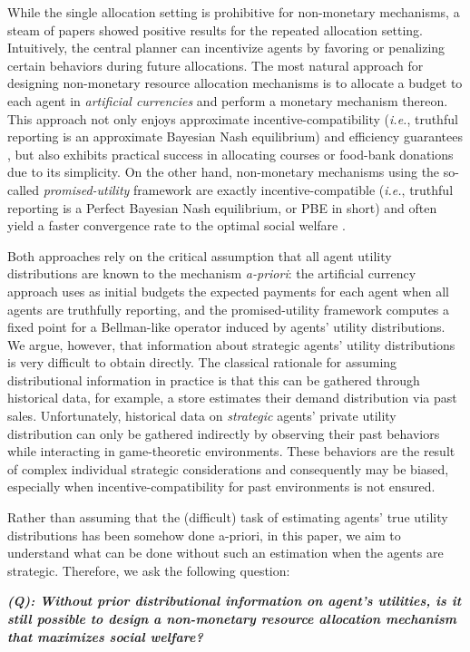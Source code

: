 While the single allocation setting is prohibitive for non-monetary mechanisms, a steam of papers showed positive results for the repeated allocation setting. Intuitively, the central planner can incentivize agents by favoring or penalizing certain behaviors during future allocations. The most natural approach for designing non-monetary resource allocation mechanisms is to allocate a budget to each agent in \textit{artificial currencies} and perform a monetary mechanism thereon. This approach not only enjoys approximate incentive-compatibility (\textit{i.e.}, truthful reporting is an approximate Bayesian Nash equilibrium) and efficiency guarantees \citep{gorokh2021monetary}, but also exhibits practical success in allocating courses \citep{budish2016bringing} or food-bank donations \citep{prendergast2017food,prendergast2022allocation} due to its simplicity. On the other hand, non-monetary mechanisms using the so-called \textit{promised-utility} framework \citep{balseiro2019multiagent} are exactly incentive-compatible (\textit{i.e.}, truthful reporting is a Perfect Bayesian Nash equilibrium, or PBE in short) and often yield a faster convergence rate to the optimal social welfare \citep{balseiro2019multiagent,blanchard2024near}.

Both approaches rely on the critical assumption that all agent utility distributions are known to the mechanism \emph{a-priori}: the artificial currency approach uses as initial budgets the expected payments for each agent when all agents are truthfully reporting, and the promised-utility framework computes a fixed point for a Bellman-like operator induced by agents' utility distributions. We argue, however, that information about strategic agents' utility distributions is very difficult to obtain directly. The classical rationale for assuming distributional information in practice is that this can be gathered through historical data, for example, a store estimates their demand distribution via past sales. Unfortunately, historical data on \emph{strategic} agents' private utility distribution can only be gathered indirectly by observing their past behaviors while interacting in game-theoretic environments. These behaviors are the result of complex individual strategic considerations and consequently may be biased, especially when incentive-compatibility for past environments is not ensured.

Rather than assuming that the (difficult) task of estimating agents' true utility distributions has been somehow done a-priori, in this paper, we aim to understand what can be done without such an estimation when the agents are strategic.
Therefore, we ask the following question:
\begin{center}
\textbf{\textit{(Q): Without prior distributional information on agent's utilities, is it still possible to design a non-monetary resource allocation mechanism that maximizes social welfare?}}
\end{center}

